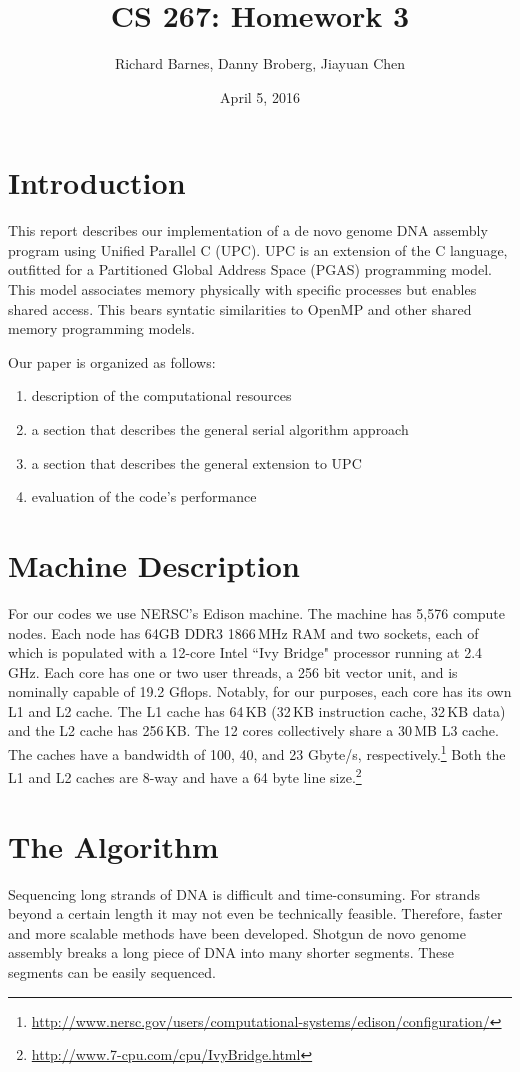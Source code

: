 \documentclass{article}
\title{CS 267: Homework 3}
\author{Richard Barnes, Danny Broberg, Jiayuan Chen}
\date{April 5, 2016}
\begin{document}
\maketitle

\section{Introduction}
This report describes our implementation of a de novo genome DNA assembly program using Unified Parallel C (UPC). UPC is an extension of the C language, outfitted for a Partitioned Global Address Space (PGAS) programming model. This model associates memory physically with specific processes but enables shared access. This bears syntatic similarities to OpenMP and other shared memory programming models.

Our paper is organized as follows:
\begin{enumerate} %
\item description of the computational resources
\item a section that describes the general serial algorithm approach
\item a section that describes the general extension to UPC
\item evaluation of the code's performance
\end{enumerate}

\section{Machine Description}
For our codes we use NERSC's Edison machine. The machine has 5,576 compute nodes. Each node has 64GB DDR3 1866\,MHz RAM and two sockets, each of which is populated with a 12-core Intel ``Ivy Bridge" processor running at 2.4\,GHz. Each core has one or two user threads, a 256 bit vector unit, and is nominally capable of 19.2 Gflops. Notably, for our purposes, each core has its own L1 and L2 cache. The L1 cache has 64\,KB (32\,KB instruction cache, 32\,KB data) and the L2 cache has 256\,KB. The 12 cores collectively share a 30\,MB L3 cache. The caches have a bandwidth of 100, 40, and 23 Gbyte/s, respectively.\footnote{\url{http://www.nersc.gov/users/computational-systems/edison/configuration/}} Both the L1 and L2 caches are 8-way and have a 64 byte line size.\footnote{\url{http://www.7-cpu.com/cpu/IvyBridge.html}} 


\section{The Algorithm}
Sequencing long strands of DNA is difficult and time-consuming. For strands beyond a certain length it may not even be technically feasible. Therefore, faster and more scalable methods have been developed. Shotgun de novo genome assembly breaks a long piece of DNA into many shorter segments. These segments can be easily sequenced.
\end{document}
